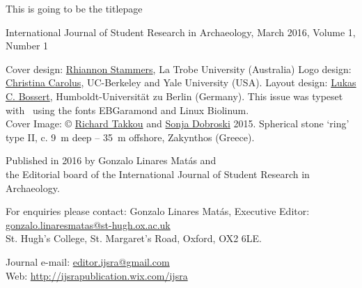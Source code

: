 	\begin{titlepage}
		
		This is going to be the titlepage
	\end{titlepage}	
\thispagestyle{empty}
\hfill
\vfill

\begin{footnotesize}
\noindent International Journal of Student Research in Archaeology,\newline
March 2016, Volume 1, Number 1\\
\vspace{2em}


\noindent Cover design: \href{https://latrobe.academia.edu/RhiannonStammers}{Rhiannon Stammers}, La Trobe University (Australia)\newline
\noindent Logo design: \href{hraf.yale.edu/about/staff/christina-carolus/}{Christina Carolus}, UC-Berkeley and Yale University (USA).\newline
\noindent Layout design: \href{https://hu-berlin.academia.edu/LukasCBossert}{Lukas C. Bossert}, Humboldt-Universität zu Berlin (Germany). \newline \indent This issue was typeset with \XeLaTeX\ using the fonts EBGaramond and {\sffamily Linux Biolinum}. \\
Cover Image: © \href{https://oxford.academia.edu/RichardTakkou}{Richard Takkou} and \href{https://st-andrews.academia.edu/SonjaDobroski}{Sonja Dobroski} 2015.\newline
\indent Spherical stone ‘ring’ type II, c. \SI{9}{\meter} deep – \SI{35}{\meter} offshore, Zakynthos (Greece). 
\vspace{2em}

\noindent Published in 2016 by Gonzalo Linares Matás and \\ the Editorial board of the International Journal of Student Research in Archaeology. 




\vspace{2em}






\noindent For enquiries please contact: Gonzalo Linares Matás, Executive Editor:\\ \href{mailto:gonzalo.linaresmatas@st-hugh.ox.ac.uk}{gonzalo.linaresmatas@st-hugh.ox.ac.uk}\\  St. Hugh’s College, St. Margaret’s Road, Oxford, OX2 6LE.

\noindent Journal e-mail: \href{mailto:editor.ijsra@gmail.com}{editor.ijsra@gmail.com}\\
\noindent Web: \href{http://ijsrapublication.wix.com/ijsra}{http://ijsrapublication.wix.com/ijsra}


\end{footnotesize}
